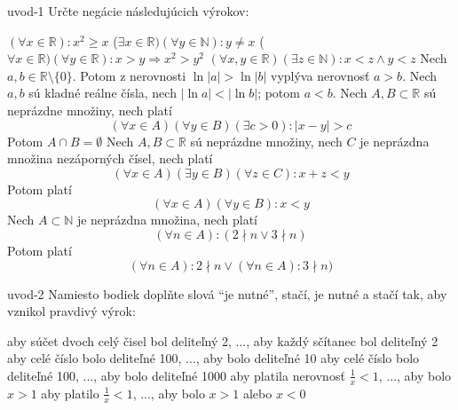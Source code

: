 \begin{defproblem}{uvod-1}
Určte negácie následujúcich výrokov:
\begin{tasks}
\task
    $(\forall x \in \mathbb{R}) : x^2 \geq x$
\task
    ($\exists x \in \mathbb{R})(\forall y \in \mathbb{N}): y \neq x$
\task
    ($\forall x \in \mathbb{R})(\forall y \in \mathbb{R}):
    x > y \Rightarrow x^2 > y^2$
\task
    $(\forall x, y \in \mathbb{R})(\exists z \in \mathbb{N}): x < z \land
    y < z$
\task
    Nech $a, b \in \mathbb{R} \setminus \{0\}$. Potom z nerovnosti
    $ \ln|a| > \ln|b| $
    vyplýva nerovnosť $a > b$.
\task
    Nech $a, b$ sú kladné reálne čísla, nech $|\ln a| < |\ln b|$; potom
    $a < b$.
\task
    Nech $A, B \subset \mathbb{R}$ sú neprázdne množiny, nech platí
    \[
        (\forall x \in A)(\forall y \in B)(\exists c > 0): |x - y| > c
    \]
    Potom $A \cap B = \emptyset$
\task
    Nech $A, B \subset \mathbb{R}$ sú neprázdne množiny, nech $C$ je
    neprázdna množina nezáporných čísel, nech platí
    \[
        (\forall x \in A)(\exists y \in B)(\forall z \in C): x + z < y
    \]
    Potom platí
    \[
        (\forall x \in A)(\forall y \in B): x < y
    \]
\task
    Nech $A \subset \mathbb{N}$ je neprázdna množina, nech platí
    \[
        (\forall n \in A): (2 \nmid n \lor 3 \nmid n)
    \]
    Potom platí
    \[
        (\forall n \in A): 2 \nmid n \lor (\forall n \in A): 3 \nmid n)
    \]
\end{tasks}
\end{defproblem}

\begin{defproblem}{uvod-2}
Namiesto bodiek doplňte slová \enquote{je nutné}, stačí, je nutné a stačí tak,
aby vznikol pravdivý výrok:
\begin{tasks}
\task
    aby súčet dvoch celý čisel bol deliteľný 2, ..., aby každý sčítanec bol
    deliteľný 2
\task
    aby celé číslo bolo deliteľné 100, ..., aby bolo deliteľné 10
\task
    aby celé číslo bolo deliteľné 100, ..., aby bolo deliteľné 1000
\task
    aby platila nerovnosť $\frac{1}{x} < 1$, ..., aby bolo $x > 1$
\task
    aby platilo $\frac{1}{x} < 1$, ..., aby bolo $x > 1$ alebo $x < 0$
\end{tasks}
\end{defproblem}

